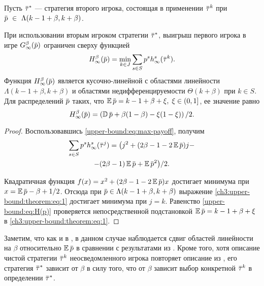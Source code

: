 {Пусть $\tauv^*$ --- стратегия второго игрока, состоящая в применении $\tauv^k$ при $\p~\in~\Lambda(k-1+\beta, k+\beta)$.

\begin{theorem}
  \label{ch3:upper-bound:theorem}
  При использовании вторым игроком стратегии $\tauv^*$, выигрыш первого игрока в игре $\theG[\infty](\p)$ ограничен сверху функцией
  \begin{equation*}
    \High(\p) = \min_{k \in J} \sum_{s \in S} p^s  h^s_\infty(\tauv^k).
  \end{equation*}
  Функция $\High(\p)$ является кусочно-линейной с областями линейности $\Lambda(k - 1 + \beta, k + \beta)$ и областями недифференцируемости $\Theta(k+\beta)$ при $k \in S$.
  Для распределений $\p$ таких, что $\E \p = k - 1 + \beta + \xi, \; \xi \in (0, 1]$, ее значение равно
  \begin{equation}
    \label{upper-bound:eq:H(p)}
    \High(\p) = \left( \D \p + \beta(1-\beta) - \xi(1-\xi) \right)/2.
  \end{equation}
\end{theorem}
\begin{proof}
  Воспользовавшись \eqref{upper-bound:eq:max-payoff}, получим
  \begin{equation}
    \label{ch3:upper-bound:theorem:eq:1}
    \begin{gathered}
    \sum_{s \in S} p^s h^s_\infty(\tauv^j) = \bigl(
      j^2 + (2\beta - 1 - 2 \E \p)j - \\
      - (2\beta - 1) \E \p + \E \p^2 
    \bigr)/2.
    \end{gathered}
  \end{equation}
  
  Квадратичная функция $f(x) = x^2 + (2\beta - 1 - 2\E \p)x$ достигает минимума
  при $x = \E \p - \beta + 1/2$. Отсюда при $\p \in \Lambda(k - 1 + \beta, k +
  \beta)$ выражение \eqref{ch3:upper-bound:theorem:eq:1} достигает минимума при $j =
  k$. Равенство \eqref{upper-bound:eq:H(p)} проверяется непосредственной
  подстановкой $\E \p = k - 1 + \beta + \xi$ в \eqref{ch3:upper-bound:theorem:eq:1}.
\end{proof}

Заметим, что как и в \cite{pyanykh16:discr:ru}, в данном случае наблюдается сдвиг областей линейности на $\beta$ относительно $\E \p$ в сравнении с результатами из \cite{domansky11}.
Кроме того, хотя описание чистой стратегии $\tauv^k$ неосведомленного игрока повторяет описание из \cite{domansky07}, его стратегия $\tauv^*$ зависит от $\beta$ в силу того, что от $\beta$ зависит выбор конкретной $\tauv^k$ в определении $\tauv^*$.

}
